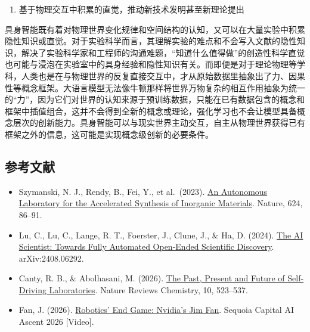 \begin{enumerate}
\def\labelenumi{\arabic{enumi}.}
\setcounter{enumi}{3}
\tightlist
\item
  基于物理交互中积累的直觉，推动新技术发明甚至新理论提出
\end{enumerate}

具身智能既有着对物理世界变化规律和空间结构的认知，又可以在大量实验中积累隐性知识或直觉。对于实验科学而言，其理解实验的难点和不会写入文献的隐性知识，解决了实验科学家和工程师的沟通难题，``知道什么值得做''的创造性科学直觉也可能与浸泡在实验室中的具身经验和隐性知识有关。而即便是对于理论物理等学科，人类也是在与物理世界的反复直接交互中，才从原始数据里抽象出了力、因果性等概念框架。大语言模型无法像牛顿那样将世界万物复杂的相互作用抽象为统一的``力''，因为它们对世界的认知来源于预训练数据，只能在已有数据包含的概念和框架中插值组合，这并不会得到全新的概念或理论，强化学习也不会让模型具备概念层次的创新能力。具身智能可以与现实世界主动交互，自主从物理世界获得已有框架之外的信息，这可能是实现概念级创新的必要条件。

\FloatBarrier
{}
\hypertarget{ux53c2ux8003ux6587ux732e-167}{%
\subsection{参考文献}\label{ux53c2ux8003ux6587ux732e-167}}

\vspace{0.25em}
\begin{itemize}
\tightlist
\item
  Szymanski, N. J., Rendy, B., Fei, Y., et al.~(2023). \href{https://www.nature.com/articles/s41586-023-06734-w}{An Autonomous Laboratory for the Accelerated Synthesis of Inorganic Materials}. Nature, 624, 86--91.
\item
  Lu, C., Lu, C., Lange, R. T., Foerster, J., Clune, J., \& Ha, D. (2024). \href{https://arxiv.org/abs/2408.06292}{The AI Scientist: Towards Fully Automated Open-Ended Scientific Discovery}. arXiv:2408.06292.
\item
  Canty, R. B., \& Abolhasani, M. (2026). \href{https://www.nature.com/articles/s41570-026-00847-2}{The Past, Present and Future of Self-Driving Laboratories}. Nature Reviews Chemistry, 10, 523--537.
\item
  Fan, J. (2026). \href{https://www.youtube.com/watch?v=3Y8aq_ofEVs}{Robotics' End Game: Nvidia's Jim Fan}. Sequoia Capital AI Ascent 2026 {[}Video{]}.
\end{itemize}

\clearpage
